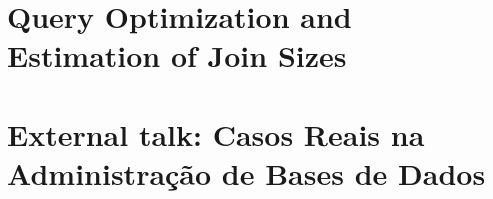 \documentclass[11pt,report]{article}
\begin{document}
	\subsection{}

\section{Query Optimization and Estimation of Join Sizes}
	
\section{External talk: Casos Reais na Administração de Bases de Dados}
	\subsection{}
	\subsection{}
\end{document}
